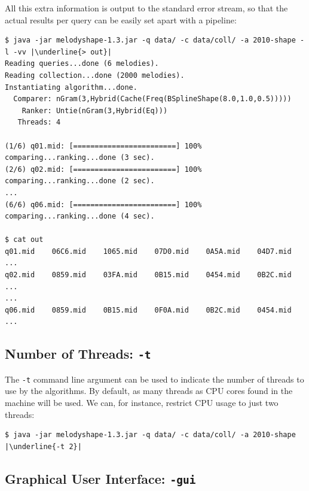 \documentclass[twoside]{article}
\begin{document}
All this extra information is output to the standard error stream, so that the actual results per query can be easily set apart with a pipeline:
\begin{lstlisting}
$ java -jar melodyshape-1.3.jar -q data/ -c data/coll/ -a 2010-shape -l -vv |\underline{> out}|
Reading queries...done (6 melodies).
Reading collection...done (2000 melodies).
Instantiating algorithm...done.
  Comparer: nGram(3,Hybrid(Cache(Freq(BSplineShape(8.0,1.0,0.5)))))
    Ranker: Untie(nGram(3,Hybrid(Eq)))
   Threads: 4
 
(1/6) q01.mid: [========================] 100% comparing...ranking...done (3 sec).
(2/6) q02.mid: [========================] 100% comparing...ranking...done (2 sec).
...
(6/6) q06.mid: [========================] 100% comparing...ranking...done (4 sec).

$ cat out
q01.mid    06C6.mid    1065.mid    07D0.mid    0A5A.mid    04D7.mid ...
q02.mid    0859.mid    03FA.mid    0B15.mid    0454.mid    0B2C.mid ...
...
q06.mid    0859.mid    0B15.mid    0F0A.mid    0B2C.mid    0454.mid ...
\end{lstlisting}

\subsection{Number of Threads: \texttt{-t}}

The \texttt{-t} command line argument can be used to indicate the number of threads to use by the algorithms. By default, as many threads as CPU cores found in the machine will be used. We can, for instance, restrict CPU usage to just two threads:
\begin{lstlisting}
$ java -jar melodyshape-1.3.jar -q data/ -c data/coll/ -a 2010-shape |\underline{-t 2}|
\end{lstlisting}

\subsection{Graphical User Interface: \texttt{-gui}}\label{ssec:gui}
\end{document}
